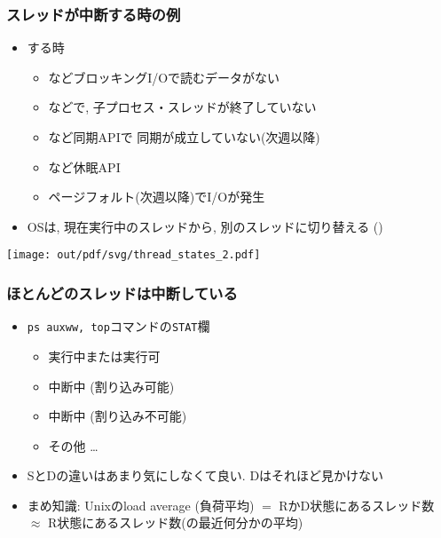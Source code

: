 \documentclass[12pt,dvipdfmx]{beamer}
\begin{document}
\begin{frame}
  \frametitle{スレッドが中断する時の例}
  \begin{itemize}
  \item {}する時
    \begin{itemize}
    \item {}などブロッキングI/Oで読むデータがない
    \item {}などで, 子プロセス・スレッドが終了していない
    \item {}など同期APIで
      同期が成立していない(次週以降)
    \item {}など休眠API
    \item ページフォルト(次週以降)でI/Oが発生
    \end{itemize}
  \item OSは, 現在実行中のスレッドから, 別のスレッドに切り替える
    ()
  \end{itemize}
  \begin{center}
    \texttt{[image: out/pdf/svg/thread\_states\_2.pdf]}
  \end{center}
\end{frame}

\begin{frame}[fragile]
  \frametitle{ほとんどのスレッドは中断している}
  \begin{itemize}
  \item {\tt ps auxww, top}コマンドの{\tt STAT}欄
    \begin{itemize}
    \item {} 実行中または実行可
    \item {} 中断中 (割り込み可能)
    \item {} 中断中 (割り込み不可能)
    \item その他 \ldots
    \end{itemize}
    
  \item SとDの違いはあまり気にしなくて良い. Dはそれほど見かけない
  \item まめ知識: Unixのload average (負荷平均)
    $=$ RかD状態にあるスレッド数
    $\approx$ R状態にあるスレッド数(の最近何分かの平均)
  \end{itemize}
\end{frame}
\end{document}
